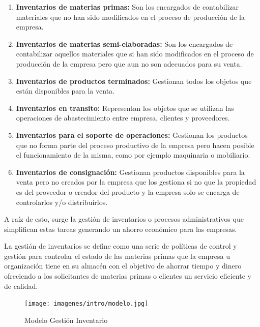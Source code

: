 \documentclass[a4paper,11pt]{book}
\begin{document}
\begin{enumerate}
\item \textbf{Inventarios de materias primas:} Son los encargados de contabilizar materiales que no han sido modificados en el proceso de producción de la empresa.
\item \textbf{Inventarios de materias semi-elaboradas:} Son los encargados de contabilizar aquellos materiales que si han sido modificados en el proceso de producción de la empresa pero que aun no son adecuados para su venta.
\item \textbf{Inventarios de productos terminados:} Gestionan todos los objetos que están disponibles para la venta.
\item \textbf{Inventarios en transito:} Representan los objetos que se utilizan las operaciones de abastecimiento entre empresa, clientes y proveedores.
\item \textbf{Inventarios para el soporte de operaciones:} Gestionan los productos que no forma parte del proceso productivo de la empresa pero hacen posible el funcionamiento de la misma, como por ejemplo maquinaria o mobiliario.
\item \textbf{Inventarios de consignación:} Gestionan productos disponibles para la venta pero no creados por la empresa que los gestiona si no que la propiedad es del proveedor o creador del producto y la empresa solo se encarga de controlarlos y/o distribuirlos.
\end{enumerate}
 

A raíz de esto, surge la gestión de inventarios o procesos administrativos que simplifican estas tareas generando un ahorro económico para las empresas. 

La gestión de inventarios\cite{gestion} se define como una serie de políticas de control y gestión para controlar el estado de las materias primas que la empresa u organización tiene en su almacén con el objetivo de ahorrar tiempo y dinero ofreciendo a los solicitantes de materias primas o clientes un servicio eficiente y de calidad.

\begin{figure}[H]  
\centering 
\texttt{[image: imagenes/intro/modelo.jpg]}
\caption{ Modelo Gestión Inventario\cite{modelo} }  
\end{figure} 
\end{document}
